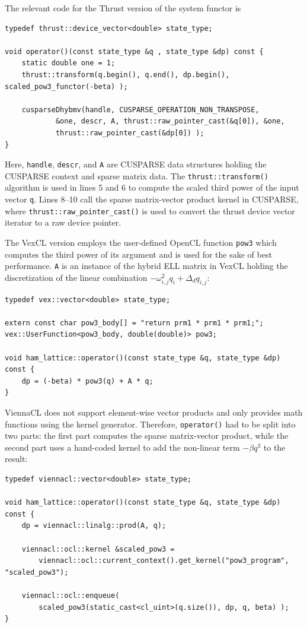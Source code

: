 \documentclass[final]{siamltex}
\newcommand{\code}[1]{\lstinline|#1|}
\begin{document}
The relevant code for the Thrust version of the system functor is
\begin{lstlisting}
typedef thrust::device_vector<double> state_type;

void operator()(const state_type &q , state_type &dp) const {
    static double one = 1;
    thrust::transform(q.begin(), q.end(), dp.begin(), scaled_pow3_functor(-beta) );

    cusparseDhybmv(handle, CUSPARSE_OPERATION_NON_TRANSPOSE,
            &one, descr, A, thrust::raw_pointer_cast(&q[0]), &one,
            thrust::raw_pointer_cast(&dp[0]) );
}
\end{lstlisting}
Here, \code{handle}, \code{descr}, and \code{A} are CUSPARSE data structures
holding the CUSPARSE context and sparse matrix data. The
\code{thrust::transform()} algorithm is used in lines 5 and 6 to compute the scaled
third power of the input vector \code{q}. Lines 8--10 call the sparse matrix-vector product kernel in CUSPARSE,
where \code{thrust::raw_pointer_cast()} is used to convert the thrust device
vector iterator to a raw device pointer.

The VexCL version employs the user-defined OpenCL function \code{pow3} which
computes the third power of its argument and is used for the sake of best performance.
\code{A} is an instance of the hybrid ELL matrix in VexCL
holding the discretization of the linear combination $- \omega_{i,j}^2 q_i + \Delta_d q_{i,j}$:
\begin{lstlisting}
typedef vex::vector<double> state_type;

extern const char pow3_body[] = "return prm1 * prm1 * prm1;";
vex::UserFunction<pow3_body, double(double)> pow3;

void ham_lattice::operator()(const state_type &q, state_type &dp) const {
    dp = (-beta) * pow3(q) + A * q;
}
\end{lstlisting}

ViennaCL does not support element-wise vector products and only provides
math functions using the kernel generator. Therefore,
\code{operator()} had to be split into two parts: the first part computes
the sparse matrix-vector product, while the second part uses a hand-coded kernel to
add the non-linear term $-\beta q^3$ to the result:
\begin{lstlisting}
typedef viennacl::vector<double> state_type;

void ham_lattice::operator()(const state_type &q, state_type &dp) const {
    dp = viennacl::linalg::prod(A, q);

    viennacl::ocl::kernel &scaled_pow3 =
        viennacl::ocl::current_context().get_kernel("pow3_program", "scaled_pow3");

    viennacl::ocl::enqueue(
        scaled_pow3(static_cast<cl_uint>(q.size()), dp, q, beta) );
}
\end{lstlisting}
\end{document}
